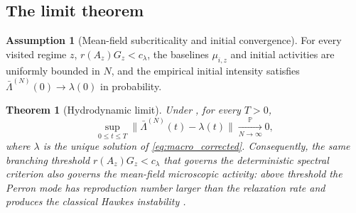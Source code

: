 \documentclass[11pt]{article}
\theoremstyle{plain}
\newtheorem{theorem}{Theorem}[section]
\theoremstyle{definition}
\newtheorem{assumption}{Assumption}
\theoremstyle{remark}
\newcommand{\Prob}{\mathbb{P}}
\begin{document}
\subsection{The limit theorem}

\begin{assumption}[Mean-field subcriticality and initial convergence]
\label{ass:subcrit_micro}
For every visited regime $z$, $r(A_z)G_z<c_\lambda$, the baselines $\mu_{i,z}$ and initial
activities are uniformly bounded in $N$, and the empirical initial intensity satisfies
$\bar\Lambda^{(N)}(0)\to\lambda(0)$ in probability.
\end{assumption}

\begin{theorem}[Hydrodynamic limit]
\label{thm:hydro}
Under , for every $T>0$,
\begin{equation}
\sup_{0\le t\le T}\big\lVert\bar\Lambda^{(N)}(t)-\lambda(t)\big\rVert\xrightarrow[N\to\infty]{\Prob}0,
\end{equation}
where $\lambda$ is the unique solution of \eqref{eq:macro_corrected}. Consequently, the same
branching threshold $r(A_z)G_z<c_\lambda$ that governs the deterministic spectral criterion also
governs the mean-field microscopic activity: above threshold the Perron mode has reproduction
number larger than the relaxation rate and produces the classical Hawkes instability
\cite{hawkes1971,bremaud1996}.
\end{theorem}
\end{document}
